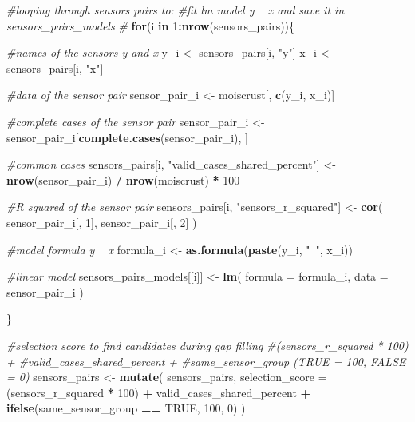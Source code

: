 \documentclass[]{article}
\newenvironment{Shaded}{\begin{snugshade}}{\end{snugshade}}
\newcommand{\CommentTok}[1]{\textcolor[rgb]{0.56,0.35,0.01}{\textit{#1}}}
\newcommand{\ControlFlowTok}[1]{\textcolor[rgb]{0.13,0.29,0.53}{\textbf{#1}}}
\newcommand{\DataTypeTok}[1]{\textcolor[rgb]{0.13,0.29,0.53}{#1}}
\newcommand{\DecValTok}[1]{\textcolor[rgb]{0.00,0.00,0.81}{#1}}
\newcommand{\KeywordTok}[1]{\textcolor[rgb]{0.13,0.29,0.53}{\textbf{#1}}}
\newcommand{\NormalTok}[1]{#1}
\newcommand{\OperatorTok}[1]{\textcolor[rgb]{0.81,0.36,0.00}{\textbf{#1}}}
\newcommand{\OtherTok}[1]{\textcolor[rgb]{0.56,0.35,0.01}{#1}}
\newcommand{\StringTok}[1]{\textcolor[rgb]{0.31,0.60,0.02}{#1}}
\begin{document}
\begin{Shaded}
\begin{Highlighting}[]
{{{{{{{{{\CommentTok{#looping through sensors pairs to:}
\CommentTok{#fit lm model y ~ x and save it in sensors_pairs_models}
\CommentTok{#}
\ControlFlowTok{for}\NormalTok{(i }\ControlFlowTok{in} \DecValTok{1}\OperatorTok{:}\KeywordTok{nrow}\NormalTok{(sensors_pairs))\{}
  
  \CommentTok{#names of the sensors y and x}
\NormalTok{  y_i <-}\StringTok{ }\NormalTok{sensors_pairs[i, }\StringTok{"y"}\NormalTok{]}
\NormalTok{  x_i <-}\StringTok{ }\NormalTok{sensors_pairs[i, }\StringTok{"x"}\NormalTok{]}
  
  \CommentTok{#data of the sensor pair}
\NormalTok{  sensor_pair_i <-}\StringTok{ }\NormalTok{moiscrust[, }\KeywordTok{c}\NormalTok{(y_i, x_i)]}
  
  \CommentTok{#complete cases of the sensor pair}
\NormalTok{  sensor_pair_i <-}\StringTok{ }\NormalTok{sensor_pair_i[}\KeywordTok{complete.cases}\NormalTok{(sensor_pair_i), ]}
   
  \CommentTok{#common cases}
\NormalTok{  sensors_pairs[i, }\StringTok{"valid_cases_shared_percent"}\NormalTok{] <-}\StringTok{ }
\StringTok{    }\KeywordTok{nrow}\NormalTok{(sensor_pair_i) }\OperatorTok{/}\StringTok{ }\KeywordTok{nrow}\NormalTok{(moiscrust) }\OperatorTok{*}\StringTok{ }\DecValTok{100}
  
  \CommentTok{#R squared of the sensor pair}
\NormalTok{  sensors_pairs[i, }\StringTok{"sensors_r_squared"}\NormalTok{] <-}\StringTok{ }\KeywordTok{cor}\NormalTok{(}
\NormalTok{    sensor_pair_i[, }\DecValTok{1}\NormalTok{],}
\NormalTok{    sensor_pair_i[, }\DecValTok{2}\NormalTok{]}
\NormalTok{    )}
  
  \CommentTok{#model formula y ~ x}
\NormalTok{  formula_i <-}\StringTok{ }\KeywordTok{as.formula}\NormalTok{(}\KeywordTok{paste}\NormalTok{(y_i, }\StringTok{"~"}\NormalTok{, x_i))}
  
  \CommentTok{#linear model}
\NormalTok{  sensors_pairs_models[[i]] <-}\StringTok{ }\KeywordTok{lm}\NormalTok{(}
    \DataTypeTok{formula =}\NormalTok{ formula_i,}
    \DataTypeTok{data =}\NormalTok{ sensor_pair_i}
\NormalTok{  )}
  
\NormalTok{\}}

\CommentTok{#selection score to find candidates during gap filling }
\CommentTok{#(sensors_r_squared * 100) +}
\CommentTok{#valid_cases_shared_percent + }
\CommentTok{#same_sensor_group (TRUE = 100, FALSE = 0)}
\NormalTok{sensors_pairs <-}\StringTok{ }\KeywordTok{mutate}\NormalTok{(}
\NormalTok{  sensors_pairs,}
  \DataTypeTok{selection_score =} 
\NormalTok{    (sensors_r_squared }\OperatorTok{*}\StringTok{ }\DecValTok{100}\NormalTok{) }\OperatorTok{+}\StringTok{ }
\StringTok{    }\NormalTok{valid_cases_shared_percent }\OperatorTok{+}\StringTok{ }
\StringTok{    }\KeywordTok{ifelse}\NormalTok{(same_sensor_group }\OperatorTok{==}\StringTok{ }\OtherTok{TRUE}\NormalTok{, }\DecValTok{100}\NormalTok{, }\DecValTok{0}\NormalTok{)}
\NormalTok{)}

}}}}}}}}}
\end{Highlighting}
\end{Shaded}
\end{document}
